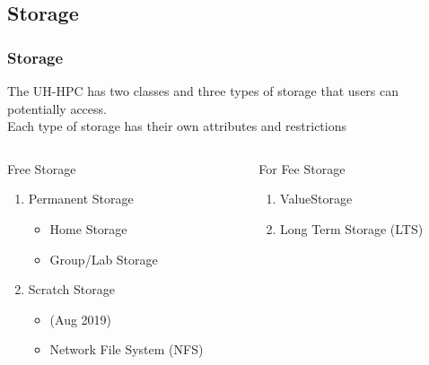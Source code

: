 \subsection{Storage}
\begin{frame}
  \frametitle{Storage}
  The UH-HPC has two classes and three types of storage that users can potentially access.\\Each type of storage has their own attributes and restrictions
	\begin{columns}
		\begin{column}{0.46\textwidth}
		\begin{block}{Free Storage}
			\begin{enumerate}
			\item Permanent Storage
				\begin{itemize}
				\item Home Storage
				\item Group/Lab Storage
				\end{itemize}
			\item Scratch Storage
				\begin{itemize}
				\item {\lustre (Aug 2019)}
				\item Network File System (NFS)
				\end{itemize}
		\end{enumerate}
		\end{block}
		\end{column}
		\begin{column}{0.46\textwidth}
		\begin{block}{For Fee Storage}
			\begin{enumerate}
				\item ValueStorage
				\item Long Term Storage (LTS)
		\end{enumerate}
		\end{block}
		\end{column}
	\end{columns}      
\end{frame}

